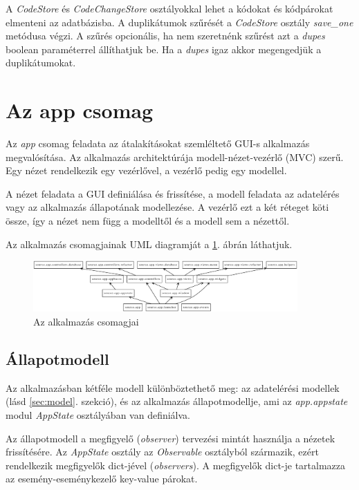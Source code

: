 A \emph{CodeStore} és \emph{CodeChangeStore} osztályokkal lehet a kódokat és kódpárokat
elmenteni az adatbázisba.
A duplikátumok szűrését a \emph{CodeStore} osztály \emph{save\_one} metódusa végzi.
A szűrés opcionális, ha nem szeretnénk szűrést azt a \emph{dupes} boolean paraméterrel állíthatjuk be.
Ha a \emph{dupes} igaz akkor megengedjük a duplikátumokat.


\section{Az app csomag}

Az \emph{app} csomag feladata az átalakításokat szemléltető GUI-s alkalmazás megvalósítása.
Az alkalmazás architektúrája modell-nézet-vezérlő (MVC) szerű.
Egy nézet rendelkezik egy vezérlővel, a vezérlő pedig egy modellel.

A nézet feladata a GUI definiálása és frissítése,
a modell feladata az adatelérés vagy az alkalmazás állapotának modellezése.
A vezérlő ezt a két réteget köti össze, így a nézet nem függ a modelltől és a modell sem a nézettől.

Az alkalmazás csomagjainak UML diagramját a \ref{fig:app_packages}. ábrán láthatjuk.

\begin{figure}[H]
	\centering
	\includegraphics[width=0.9\textwidth]{images/uml/apppackages.eps}
	\caption{\label{fig:app_packages}Az alkalmazás csomagjai}
\end{figure}

\subsection{Állapotmodell}
\label{subsec:appstate}

Az alkalmazásban kétféle modell különböztethető meg:
az adatelérési modellek (lásd \ref{sec:model}. szekció),
és az alkalmazás állapotmodellje, ami az \emph{app.appstate} modul 
\emph{AppState} osztályában van definiálva.

Az állapotmodell a megfigyelő (\emph{observer}) tervezési mintát használja a nézetek frissítésére.
Az \emph{AppState} osztály az \emph{Observable} osztályból származik,
ezért rendelkezik megfigyelők dict-jével (\emph{observers}).
A megfigyelők dict-je tartalmazza az esemény-eseménykezelő key-value párokat.

